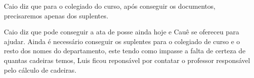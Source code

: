 \documentclass{ata-calico}
\begin{document}
Caio diz que para o colegiado do curso, após conseguir os documentos, precisaremos apenas dos suplentes.

Caio diz que pode conseguir a ata de posse ainda hoje e Cauê se ofereceu para ajudar. Ainda é necessário conseguir os suplentes para o colegiado de curso e o resto dos nomes do departamento, este tendo como impasse a falta de certeza de quantas cadeiras temos, Luis ficou reponsável por contatar o professor responsável pelo cálculo de cadeiras. 

\end{document}
